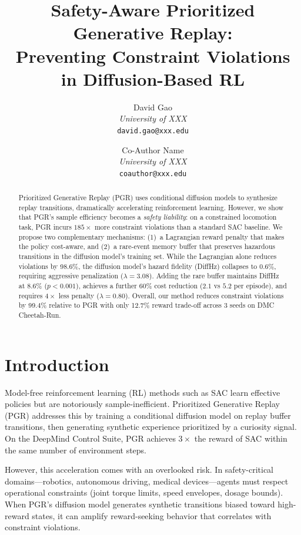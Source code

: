 \documentclass[11pt]{article}
\title{Safety-Aware Prioritized Generative Replay:\\Preventing Constraint Violations in Diffusion-Based RL}
\author{
  David Gao \\
  \textit{University of XXX} \\
  \texttt{david.gao@xxx.edu}
  \and
  Co-Author Name \\
  \textit{University of XXX} \\
  \texttt{coauthor@xxx.edu}
}
\date{}
\begin{document}
\maketitle

\begin{abstract}
Prioritized Generative Replay (PGR) uses conditional diffusion models to synthesize replay transitions, dramatically accelerating reinforcement learning.
However, we show that PGR's sample efficiency becomes a \emph{safety liability}: on a constrained locomotion task, PGR incurs $185\times$ more constraint violations than a standard SAC baseline.
We propose two complementary mechanisms: (1)~a Lagrangian reward penalty that makes the policy cost-aware, and (2)~a rare-event memory buffer that preserves hazardous transitions in the diffusion model's training set.
While the Lagrangian alone reduces violations by 98.6\%, the diffusion model's hazard fidelity (DiffHz) collapses to 0.6\%, requiring aggressive penalization ($\lambda{=}3.08$).
Adding the rare buffer maintains DiffHz at 8.6\% ($p{<}0.001$), achieves a further 60\% cost reduction ($2.1$ vs $5.2$ per episode), and requires $4\times$ less penalty ($\lambda{=}0.80$).
Overall, our method reduces constraint violations by 99.4\% relative to PGR with only 12.7\% reward trade-off across 3 seeds on DMC Cheetah-Run.
\end{abstract}

\section{Introduction}

Model-free reinforcement learning (RL) methods such as SAC \citep{haarnoja2018sac} learn effective policies but are notoriously sample-inefficient.
Prioritized Generative Replay (PGR) \citep{wang2025pgr} addresses this by training a conditional diffusion model on replay buffer transitions, then generating synthetic experience prioritized by a curiosity signal.
On the DeepMind Control Suite, PGR achieves $3\times$ the reward of SAC within the same number of environment steps.

However, this acceleration comes with an overlooked risk.
In safety-critical domains---robotics, autonomous driving, medical devices---agents must respect operational constraints (joint torque limits, speed envelopes, dosage bounds).
When PGR's diffusion model generates synthetic transitions biased toward high-reward states, it can amplify reward-seeking behavior that correlates with constraint violations.
\end{document}
